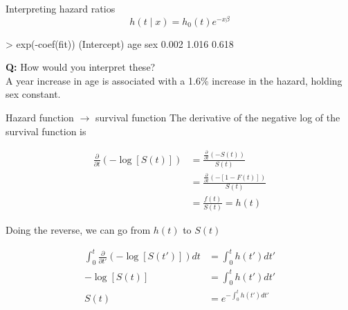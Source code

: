 \documentclass{beamer}
\newcommand\blue[1]{{\color{blue}#1}}
\newcommand\bblue[1]{{\color{blue}\textbf{#1}}}
\begin{document}
\begin{frame}[fragile]{Interpreting hazard ratios}
$$h(t\mid x) = h_0(t)e^{-x\beta}$$
\begin{semiverbatim}
> exp(-coef(fit))
(Intercept)         age         sex 
      0.002       1.016       0.618
\end{semiverbatim}
\bblue{Q:} How would you interpret these? \\ \pause
A year increase in age is associated with a 1.6\% increase in the hazard, holding sex constant.
\end{frame}


\begin{frame}{Hazard function $\rightarrow$ survival function}
The derivative of the negative log of the survival function is
\begin{footnotesize}
$$\begin{aligned}
\frac{\partial}{\partial t} \left(-\log\left[S(t)\right]\right) &= \frac{\frac{\partial}{\partial t} \left(-S(t)\right)}{S(t)} \\
&= \frac{\frac{\partial}{\partial t} \left(-[1 - F(t)]\right)}{S(t)} \\
&= \frac{f(t)}{S(t)} = h(t)
\end{aligned}$$
\end{footnotesize} \pause
Doing the reverse, we can go from $h(t)$ to $S(t)$
\begin{footnotesize}
$$\begin{aligned}
\int_0^t \frac{\partial}{\partial t'} \left(-\log\left[S(t')\right]\right)dt &= \int_0^t h(t') dt' \\
-\log\left[S(t)\right] &= \int_0^t h(t') dt' \\
S(t) &= e^{-\int_0^t h(t') dt'}
\end{aligned}$$
\end{footnotesize}
\end{frame}
\end{document}
